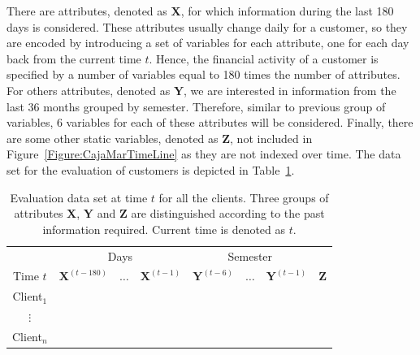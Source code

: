 \documentclass{article}
\theoremstyle{theorem}
\theoremstyle{definition}
\newcommand{\X}{\mathbf{X}}
\newcommand{\Y}{\mathbf{Y}}
\newcommand{\Z}{\mathbf{Z}}
\begin{document}
{\begin{itemize}
There are attributes, denoted as $\X$, for which information during the last 180 days is considered. 
These attributes usually change daily for a customer, so they are encoded by introducing a set of variables for each attribute, one for each day back from the current time $t$. Hence, the financial activity of a customer is specified by a number of variables equal to 180 times the number of attributes. For others attributes, denoted as $\Y$, we are interested in information from the last $36$ months grouped by semester. 
Therefore, similar to previous group of variables, $6$ variables for each of these attributes will be considered. Finally, there are some other static variables, denoted as $\Z$, not included in Figure~\ref{Figure:CajaMarTimeLine} as they are not indexed over time. The data set for the evaluation of customers is depicted in Table~\ref{tab:EvaluationDataset}. 




\begin{table}[ht!]
\centering
\begin{tabular}{c|ccc|ccc|c}
	&\multicolumn{3}{c|}{Days} & \multicolumn{3}{c|}{Semester} \\
     Time $t$              & $\X^{(t-180)}$ & $\ldots$ & $\X^{(t-1)} $ & $\Y^{(t-6)}$  & $\ldots$ & $\Y^{(t-1)} $ & $\Z$  \\  
\hline
Client$_1$  &                                                  &              &                     &                               &                     &        \\ 
$\vdots$      &                                                 &               &                     &                                &                     &      \\ 
Client$_n$  &                                                &               &                     &                                &                     &     \\ 
\end{tabular}
\caption{Evaluation data set at time $t$ for all the clients. Three groups of attributes $\X$, $\Y$ and $\Z$ are distinguished according to the past information required. Current time is denoted as $t$.}
\label{tab:EvaluationDataset} 
\end{table}


\end{itemize}}
\end{document}
